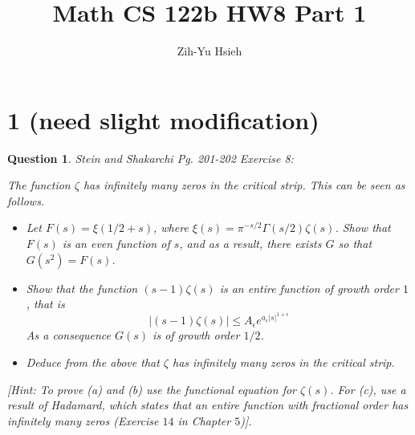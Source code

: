 \documentclass{article}
\title{Math CS 122b HW8 Part 1}
\author{Zih-Yu Hsieh}
\newtheorem{question}{Question}
\begin{document}
\maketitle

\section*{1 (need slight modification)}
\begin{myBox}[]{}
    \begin{question}
        Stein and Shakarchi Pg. 201-202 Exercise 8:

        The function $\zeta$ has infinitely many zeros in the critical strip. This can be seen as follows.
        \begin{itemize}
            \item[(a)] Let $F(s)=\xi(1/2+s)$, where $\xi(s)=\pi^{-s/2}\Gamma(s/2)\zeta(s)$. 
            Show that $F(s)$ is an even function of $s$, and as a result, there exists $G$ so that $G(s^2)=F(s)$.
            \item[(b)] Show that the function $(s-1)\zeta(s)$ is an entire function of growth order $1$, that is 
            $$|(s-1)\zeta(s)|\leq A_\epsilon e^{a_\epsilon |s|^{1+\epsilon}}$$
            As a consequence $G(s)$ is of growth order $1/2$.
            \item[(c)] Deduce from the above that $\zeta$ has infinitely many zeros in the critical strip.
        \end{itemize}
        [Hint: To prove (a) and (b) use the functional equation for $\zeta(s)$. For (c), use a result of Hadamard, which states that an entire function with fractional order has infinitely many zeros (Exercise $14$ in Chapter $5$)].
    \end{question}
\end{myBox}
\end{document}
